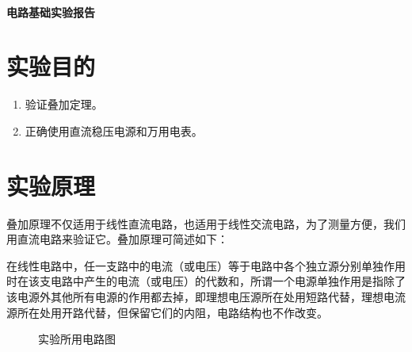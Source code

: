 \documentclass[a4paper,utf8]{article}
\begin{document}
\begin{center}
    {\mbox{}\\[7em]\bfseries\songti%
    电路基础实验报告}\\[34mm]
\end{center}
\newpage
\section{实验目的}
\begin{enumerate}
    \item 验证叠加定理。
    \item 正确使用直流稳压电源和万用电表。
\end{enumerate}

\section{实验原理}%
    叠加原理不仅适用于线性直流电路，也适用于线性交流电路，为了测量方便，我们用直流电路来验证它。叠加原理可简述如下：\par
    在线性电路中，任一支路中的电流（或电压）等于电路中各个独立源分别单独作用时在该支电路中产生的电流（或电压）的代数和，所谓一个电源单独作用是指除了该电源外其他所有电源的作用都去掉，即理想电压源所在处用短路代替，理想电流源所在处用开路代替，但保留它们的内阻，电路结构也不作改变。
    \begin{figure}[!ht]
        \caption{实验所用电路图}
    \end{figure}
\end{document}
